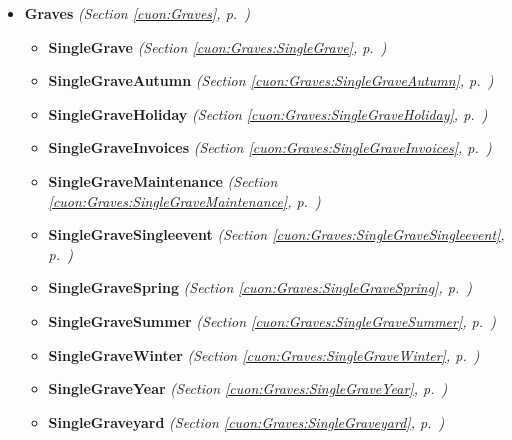 \begin{itemize}
\begin{itemize}
  \end{itemize}
\item \textbf{Graves}
  \textit{(Section \ref{cuon:Graves}, p.~\pageref{cuon:Graves})}

  \begin{itemize}
\setlength{\parskip}{0ex}
    \item \textbf{SingleGrave}
  \textit{(Section \ref{cuon:Graves:SingleGrave}, p.~\pageref{cuon:Graves:SingleGrave})}

    \item \textbf{SingleGraveAutumn}
  \textit{(Section \ref{cuon:Graves:SingleGraveAutumn}, p.~\pageref{cuon:Graves:SingleGraveAutumn})}

    \item \textbf{SingleGraveHoliday}
  \textit{(Section \ref{cuon:Graves:SingleGraveHoliday}, p.~\pageref{cuon:Graves:SingleGraveHoliday})}

    \item \textbf{SingleGraveInvoices}
  \textit{(Section \ref{cuon:Graves:SingleGraveInvoices}, p.~\pageref{cuon:Graves:SingleGraveInvoices})}

    \item \textbf{SingleGraveMaintenance}
  \textit{(Section \ref{cuon:Graves:SingleGraveMaintenance}, p.~\pageref{cuon:Graves:SingleGraveMaintenance})}

    \item \textbf{SingleGraveSingleevent}
  \textit{(Section \ref{cuon:Graves:SingleGraveSingleevent}, p.~\pageref{cuon:Graves:SingleGraveSingleevent})}

    \item \textbf{SingleGraveSpring}
  \textit{(Section \ref{cuon:Graves:SingleGraveSpring}, p.~\pageref{cuon:Graves:SingleGraveSpring})}

    \item \textbf{SingleGraveSummer}
  \textit{(Section \ref{cuon:Graves:SingleGraveSummer}, p.~\pageref{cuon:Graves:SingleGraveSummer})}

    \item \textbf{SingleGraveWinter}
  \textit{(Section \ref{cuon:Graves:SingleGraveWinter}, p.~\pageref{cuon:Graves:SingleGraveWinter})}

    \item \textbf{SingleGraveYear}
  \textit{(Section \ref{cuon:Graves:SingleGraveYear}, p.~\pageref{cuon:Graves:SingleGraveYear})}

    \item \textbf{SingleGraveyard}
  \textit{(Section \ref{cuon:Graves:SingleGraveyard}, p.~\pageref{cuon:Graves:SingleGraveyard})}


\end{itemize}
\end{itemize}
